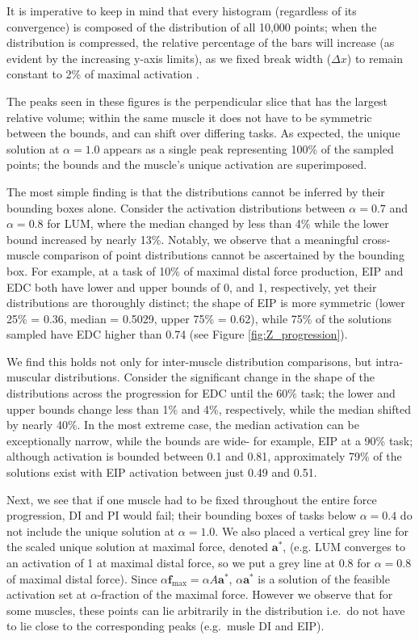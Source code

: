 It is imperative to keep in mind that every histogram (regardless of its convergence) is composed of the distribution of all 10,000 points; when the distribution is compressed, the relative percentage of the bars will increase (as evident by the increasing y-axis limits), as we fixed break width ($\Delta x$) to remain constant to 2\% of maximal activation \cite{ball1997elementary}.

The peaks seen in these figures is the perpendicular slice that has the largest relative volume; within the same muscle it does not have to be symmetric between the bounds, and can shift over differing tasks.
As expected, the unique solution at $\alpha=1.0$ appears as a single peak representing 100\% of the sampled points; the bounds and the muscle's unique activation are superimposed.

The most simple finding is that the distributions cannot be inferred by their bounding boxes alone.
Consider the activation distributions between $\alpha = 0.7$ and $\alpha = 0.8$ for LUM, where the median changed by less than 4\% while the lower bound increased by nearly 13\%.
Notably, we observe that a meaningful cross-muscle comparison of point distributions cannot be ascertained by the bounding box. For example, at a task of 10\% of maximal distal force production, EIP and EDC both have lower and upper bounds of 0, and 1, respectively, yet their distributions are thoroughly distinct; the shape of EIP is more symmetric (lower 25\% = 0.36, median = 0.5029, upper 75\% = 0.62), while 75\% of the solutions sampled have EDC higher than 0.74 (see Figure \ref{fig:Z_progression}).

We find this holds not only for inter-muscle distribution comparisons, but intra-muscular distributions. Consider the significant change in the shape of the distributions across the progression for EDC until the 60\% task; the lower and upper bounds change less than 1\% and 4\%, respectively, while the median shifted by nearly 40\%.
In the most extreme case, the median activation can be exceptionally narrow, while the bounds are wide- for example, EIP at a 90\% task; although activation is bounded between 0.1 and 0.81, approximately 79\% of the solutions exist with EIP activation between just 0.49 and 0.51.

Next, we see that if one muscle had to be fixed throughout the entire force progression, DI and PI would fail; their bounding boxes of tasks below $\alpha=0.4$ do not include the unique solution at $\alpha=1.0$.
We also placed a vertical grey line for the scaled unique solution at maximal force, denoted $\textbf{a}^*$, (e.g. LUM converges to an activation of 1 at maximal distal force, so we put a grey line at 0.8 for $\alpha=0.8$ of maximal distal force).
Since $\alpha \textbf{f}_{\max} = \alpha A \textbf{a}^*$, $\alpha \textbf{a}^*$ is a solution of the feasible activation set at $\alpha$-fraction of the maximal force.
However we observe that for some muscles, these points can lie arbitrarily in the distribution i.e.\ do not have to lie close to the corresponding peaks (e.g.\ musle DI and EIP).


